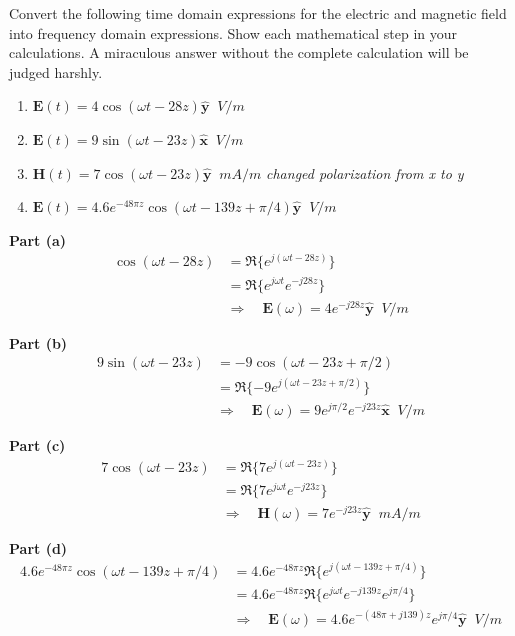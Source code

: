 \documentclass[11pt]{article}
\begin{document}
\makeAssignmentTitle

\begin{homeworkProblem}

Convert the following time domain expressions for the electric and magnetic field into frequency domain expressions. 
Show each mathematical step in your calculations. A miraculous answer without the complete calculation will be judged harshly.

\begin{enumerate}[label=(\alph*), topsep=5pt, itemsep=0pt]
    \item $\mathbf{E}(t)=4 \cos (\omega t-28 z) \hat{\mathbf{y}} \;\; \unit{V/m}$
    \item $\mathbf{E}(t)=9 \sin (\omega t-23 z) \hat{\mathbf{x}} \;\; \unit{V/m}$
    \item $\mathbf{H}(t)=7 \cos (\omega t-23 z) \hat{\mathbf{y}} \;\; \unit{mA/m}$ \qquad \textit{changed polarization from x to y}
    \item $\mathbf{E}(t)=4.6 e^{-48 \pi z} \cos (\omega t-139 z+\pi / 4) \hat{\mathbf{y}} \;\; \unit{V/m}$
\end{enumerate} \vspace{1\baselineskip}

\solution

\textbf{Part (a)}
\begin{align*}
    \cos (\omega t - 28 z) &= \Re \{ e^{j(\omega t - 28 z)}\} \\
    &= \Re \{ e^{j\omega t} e^{-j 28 z}\} \\
    &\Rightarrow \quad \mathbf{E}(\omega) = 4 e^{-j 28 z} \hat{\mathbf{y}} \;\; \unit{V/m}
\end{align*}

\textbf{Part (b)}
\begin{align*}
    9 \sin (\omega t - 23 z) &= -9 \cos (\omega t - 23 z + \pi/2) \\
    &= \Re \{ -9 e^{j(\omega t - 23 z + \pi/2)}\} \\
    &\Rightarrow \quad \mathbf{E}(\omega) = 9 e^{j \pi/2} e^{-j 23 z} \hat{\mathbf{x}} \;\; \unit{V/m}
\end{align*}

\textbf{Part (c)}
\begin{align*}
    7 \cos (\omega t - 23 z) &= \Re \{ 7 e^{j(\omega t - 23 z)}\} \\
    &= \Re \{ 7 e^{j\omega t} e^{-j 23 z}\} \\
    &\Rightarrow \quad \mathbf{H}(\omega) = 7 e^{-j 23 z} \hat{\mathbf{y}} \;\; \unit{mA/m}
\end{align*}

\textbf{Part (d)}
\begin{align*}
    4.6 e^{-48 \pi z} \cos (\omega t - 139 z + \pi/4) &= 4.6 e^{-48 \pi z} \Re \{ e^{j(\omega t - 139 z + \pi/4)}\} \\
    &= 4.6 e^{-48 \pi z} \Re \{ e^{j\omega t} e^{-j 139 z} e^{j \pi/4}\} \\
    &\Rightarrow \quad \mathbf{E}(\omega) = 4.6 e^{-(48\pi +j 139) z} e^{j \pi/4} \hat{\mathbf{y}} \;\; \unit{V/m}
\end{align*}

\end{homeworkProblem}
\end{document}
